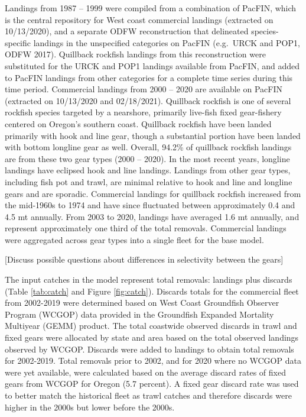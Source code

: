 \documentclass[11pt,
  english,
  a4paper,
]{article}
\begin{document}
Landings from 1987 -- 1999 were compiled from a combination of PacFIN, which is the central repository for West coast commercial landings (extracted on 10/13/2020), and a separate ODFW reconstruction that delineated species-specific landings in the unspecified categories on PacFIN (e.g.~URCK and POP1, ODFW 2017). Quillback rockfish landings from this reconstruction were substituted for the URCK and POP1 landings available from PacFIN, and added to PacFIN landings from other categories for a complete time series during this time period. Commercial landings from 2000 -- 2020 are available on PacFIN (extracted on 10/13/2020 and 02/18/2021). Quillback rockfish is one of several rockfish species targeted by a nearshore, primarily live-fish fixed gear-fishery centered on Oregon's southern coast. Quillback rockfish have been landed primarily with hook and line gear, though a substantial portion have been landed with bottom longline gear as well. Overall, 94.2\% of quillback rockfish landings are from these two gear types (2000 -- 2020). In the most recent years, longline landings have eclipsed hook and line landings. Landings from other gear types, including fish pot and trawl, are minimal relative to hook and line and longline gears and are sporadic. Commercial landings for quillback rockfish increased from the mid-1960s to 1974 and have since fluctuated between approximately 0.4 and 4.5 mt annually. From 2003 to 2020, landings have averaged 1.6 mt annually, and represent approximately one third of the total removals. Commercial landings were aggregated across gear types into a single fleet for the base model.

\leavevmode\tagmcend\tagstructend\par


{[}Discuss possible questions about differences in selectivity between the gears{]}

\leavevmode\tagmcend\tagstructend\par


The input catches in the model represent total removals: landings plus discards (Table \ref{tab:catch} and Figure \ref{fig:catch}). Discards totals for the commercial fleet from 2002-2019 were determined based on West Coast Groundfish Observer Program (WCGOP) data provided in the Groundfish Expanded Mortality Multiyear (GEMM) product. The total coastwide observed discards in trawl and fixed gears were allocated by state and area based on the total observed landings observed by WCGOP. Discards were added to landings to obtain total removals for 2002-2019. Total removals prior to 2002, and for 2020 where no WCGOP data were yet available, were calculated based on the average discard rates of fixed gears from WCGOP for Oregon (5.7 percent). A fixed gear discard rate was used to better match the historical fleet as trawl catches and therefore discards were higher in the 2000s but lower before the 2000s.
\end{document}
